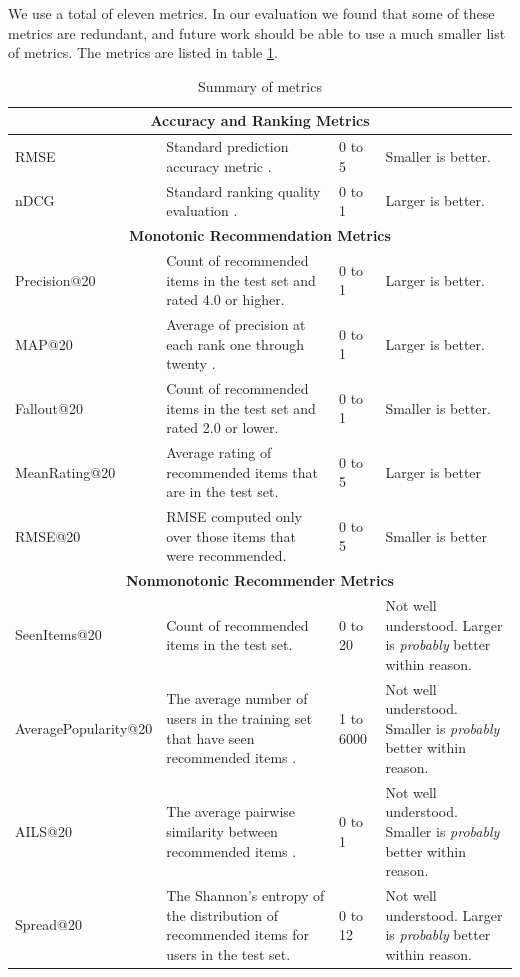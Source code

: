 \documentclass[letterpaper]{sig-alternate}
\begin{document}
  We use a total of eleven metrics.
  In our evaluation we found that some of these metrics are redundant, and future work should be able to use a much smaller list of metrics.
  The metrics are listed in table \ref{tbl:metrics}.
  \begin{table}[ht!]
    \centering
    \begin{tabular}{|p{7em}|p{20em}|p{4em}|p{18em}|}
      \hline
      \multicolumn{4}{|c|}{{\bf Accuracy and Ranking Metrics}} \\\hline
      RMSE                   & Standard prediction accuracy metric \cite{handbook}. & 0 to 5 & Smaller is better. \\\hline
      nDCG                   & Standard ranking quality evaluation \cite{handbook}. & 0 to 1 & Larger is better. \\\hline
      \hline
      \multicolumn{4}{|c|}{{\bf Monotonic Recommendation Metrics}} \\\hline
      Precision@20           & Count of recommended items in the test set and rated 4.0 or higher\footnotemark[1] \cite{handbook}. & 0 to 1 & Larger is better. \\\hline
      MAP@20                 & Average of precision at each rank one through twenty \cite{manning2008introduction}. & 0 to 1 & Larger is better.\\\hline
      Fallout@20             & Count of recommended items in the test set and rated 2.0 or lower\footnotemark[1] \cite{handbook}. & 0 to 1 & Smaller is better. \\\hline
      MeanRating@20          & Average rating of recommended items that are in the test set.& 0 to 5 & Larger is better \\\hline
      RMSE@20                & RMSE computed only over those items that were recommended.& 0 to 5 & Smaller is better \\\hline
      \hline
      \multicolumn{4}{|c|}{{\bf Nonmonotonic Recommender Metrics}} \\\hline
      SeenItems@20           & Count of recommended items in the test set. & 0 to 20 & Not well understood. \newline Larger is \emph{probably} better within reason. \\\hline
      Average\-Popularity@20 & The average number of users in the training set that have seen recommended items \cite{zieglerDiversity}.& 1 to 6000 & Not well understood. \newline Smaller is \emph{probably} better within reason. \\\hline
      AILS@20                & The average pairwise similarity between recommended items \cite{zieglerDiversity}. & 0 to 1 & Not well understood. \newline  Smaller is \emph{probably} better within reason. \\\hline
      Spread@20              & The Shannon's entropy of the distribution of recommended items for users in the test set. & 0 to 12 & Not well understood. \newline Larger is \emph{probably} better within reason. \\\hline
    \end{tabular}
    \caption{Summary of metrics}
    \label{tbl:metrics}
  \end{table}
\end{document}
